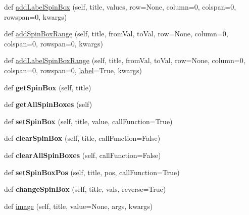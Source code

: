 \begin{DoxyCompactItemize}
\item 
def \hyperlink{classappjar_1_1gui_a4c665fc9921dff98bdabeff571edc32f}{add\+Label\+Spin\+Box} (self, title, values, row=None, column=0, colspan=0, rowspan=0, kwargs)
\item 
def \hyperlink{classappjar_1_1gui_a315791f6959af7a09c481e2526956efa}{add\+Spin\+Box\+Range} (self, title, from\+Val, to\+Val, row=None, column=0, colspan=0, rowspan=0, kwargs)
\item 
def \hyperlink{classappjar_1_1gui_af6f7f43041b9da75c011fdbbe5b604e7}{add\+Label\+Spin\+Box\+Range} (self, title, from\+Val, to\+Val, row=None, column=0, colspan=0, rowspan=0, \hyperlink{classappjar_1_1gui_a161659a9096715ced2da924ab88ddecc}{label}=True, kwargs)
\item 
\mbox{\label{classappjar_1_1gui_ace16eab8992ee9bc4ea54f0e77542c7a}} 
def {\bfseries get\+Spin\+Box} (self, title)
\item 
\mbox{\label{classappjar_1_1gui_a38ad10d5477a640d5e61a9f5922acb90}} 
def {\bfseries get\+All\+Spin\+Boxes} (self)
\item 
\mbox{\label{classappjar_1_1gui_a4e40a3369cd32a82b0cec0f7ea7c56d0}} 
def {\bfseries set\+Spin\+Box} (self, title, value, call\+Function=True)
\item 
\mbox{\label{classappjar_1_1gui_a0cf6bcc6b3fa9ca259ac86e9bf2f537f}} 
def {\bfseries clear\+Spin\+Box} (self, title, call\+Function=False)
\item 
\mbox{\label{classappjar_1_1gui_aaaaa13946d825845a4672a3e47d5c99f}} 
def {\bfseries clear\+All\+Spin\+Boxes} (self, call\+Function=False)
\item 
\mbox{\label{classappjar_1_1gui_a42b28c16adb33d8ec3e10cb1cecff1ec}} 
def {\bfseries set\+Spin\+Box\+Pos} (self, title, pos, call\+Function=True)
\item 
\mbox{\label{classappjar_1_1gui_a0227ca829db3cfbc677fcd2097eba074}} 
def {\bfseries change\+Spin\+Box} (self, title, vals, reverse=True)
\item 
def \hyperlink{classappjar_1_1gui_a7bf059e8a509826c130aacb56902d593}{image} (self, title, value=None, args, kwargs)

\end{DoxyCompactItemize}
